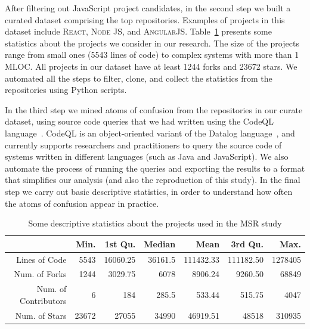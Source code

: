 After filtering out JavaScript project candidates, in the second step we built a curated dataset comprising the top \minedprojects repositories. Examples of projects in this dataset include \textsc{React}, \textsc{Node JS}, and \textsc{AngularJS}. Table~\ref{tab:projects-statistics} presents some statistics about the projects we consider in our research. The size of the projects range from small ones (5543 lines of code) to complex systems with more than 1 MLOC. All projects in our dataset have at least \num{1244} forks and \num{23672} stars. We automated all the steps to filter, clone, and collect the statistics from the repositories using Python scripts.

In the third step we mined atoms of confusion from the repositories in our curate dataset, using source code queries that we had written using the CodeQL language~\cite{moor:gttse2007}. CodeQL is an object-oriented variant of the Datalog language~\cite{rodriguez2020efficient}, and currently supports researchers and practitioners to query the source code of systems written in different languages (such as Java and JavaScript). We also automate the process of running the queries and exporting the results to a format that simplifies our
analysis (and also the reproduction of this study). In the final step we carry
out basic descriptive statistics, in order to understand how often the
atoms of confusion appear in practice. 

\begin{table}[ht]
 \centering
 \begin{tabular}{rrrrrrr}
   \hline
             & Min. & 1st Qu. & Median & Mean & 3rd Qu. & Max. \\ \hline
 Lines of Code           & \num{5543}  & \num{16060.25} & \num{36161.5} & \num{111432.33} & \num{111182.50} & \num{1278405} \\
 Num. of Forks     & \num{1244}   & \num{3029.75} & \num{6078} & \num{8906.24} & \num{9260.50} & \num{68849} \\
 Num. of Contributors  & \num{6}   & \num{184} & \num{285.5} & \num{533.44} & \num{515.75} & \num{4047} \\
 Num. of Stars        & \num{23672} & \num{27055} & \num{34990} & \num{46919.51} & \num{48518} & \num{310935} \\
 
    \hline
 \end{tabular}
 \caption{Some descriptive statistics about the projects used in the MSR study}
 \label{tab:projects-statistics} 
 \end{table}


